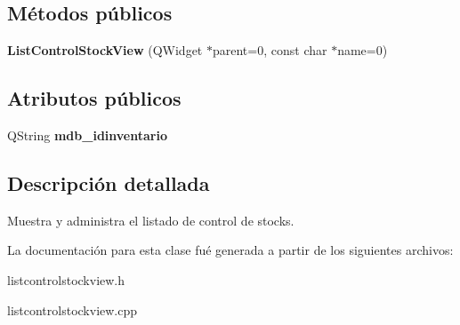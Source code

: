\subsection*{M\'{e}todos p\'{u}blicos}
\begin{CompactItemize}
\item 
{\bf List\-Control\-Stock\-View} (QWidget $\ast$parent=0, const char $\ast$name=0)\label{classListControlStockView_a0}

\end{CompactItemize}
\subsection*{Atributos p\'{u}blicos}
\begin{CompactItemize}
\item 
QString {\bf mdb\_\-idinventario}\label{classListControlStockView_o0}

\end{CompactItemize}


\subsection{Descripci\'{o}n detallada}
Muestra y administra el listado de control de stocks. 



La documentaci\'{o}n para esta clase fu\'{e} generada a partir de los siguientes archivos:\begin{CompactItemize}
\item 
listcontrolstockview.h\item 
listcontrolstockview.cpp\end{CompactItemize}
